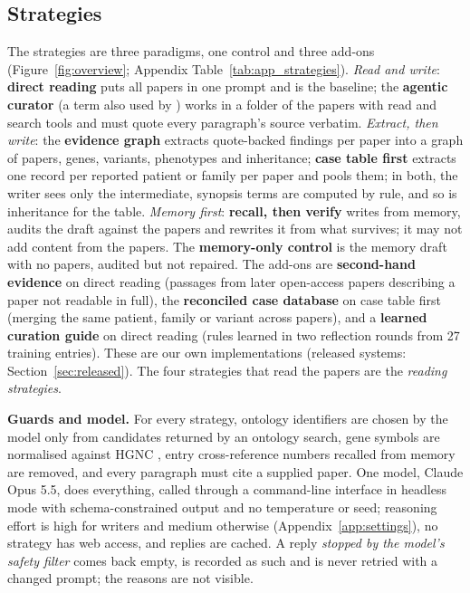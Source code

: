 \documentclass{article} %
\begin{document}
\subsection{Strategies}
\label{sec:strategies}
The strategies are three paradigms, one control and three add-ons (Figure~\ref{fig:overview}; Appendix Table~\ref{tab:app_strategies}). \emph{Read and write}: \textbf{direct reading} puts all papers in one prompt and is the baseline; the \textbf{agentic curator} (a term also used by \citealp{balhoff2026frontier}) works in a folder of the papers with read and search tools and must quote every paragraph's source verbatim. \emph{Extract, then write}: the \textbf{evidence graph} extracts quote-backed findings per paper into a graph of papers, genes, variants, phenotypes and inheritance; \textbf{case table first} extracts one record per reported patient or family per paper and pools them; in both, the writer sees only the intermediate, synopsis terms are computed by rule, and so is inheritance for the table. \emph{Memory first}: \textbf{recall, then verify} writes from memory, audits the draft against the papers and rewrites it from what survives; it may not add content from the papers. The \textbf{memory-only control} is the memory draft with no papers, audited but not repaired. The add-ons are \textbf{second-hand evidence} on direct reading (passages from later open-access papers describing a paper not readable in full), the \textbf{reconciled case database} on case table first (merging the same patient, family or variant across papers), and a \textbf{learned curation guide} on direct reading (rules learned in two reflection rounds from 27 training entries). These are our own implementations (released systems: Section~\ref{sec:released}). The four strategies that read the papers are the \emph{reading strategies}.

\textbf{Guards and model.} For every strategy, ontology identifiers are chosen by the model only from candidates returned by an ontology search, gene symbols are normalised against HGNC \citep{seal2023genenames}, entry cross-reference numbers recalled from memory are removed, and every paragraph must cite a supplied paper. One model, Claude Opus 5.5, does everything, called through a command-line interface in headless mode with schema-constrained output and no temperature or seed; reasoning effort is high for writers and medium otherwise (Appendix~\ref{app:settings}), no strategy has web access, and replies are cached. A reply \emph{stopped by the model's safety filter} comes back empty, is recorded as such and is never retried with a changed prompt; the reasons are not visible.
\end{document}
